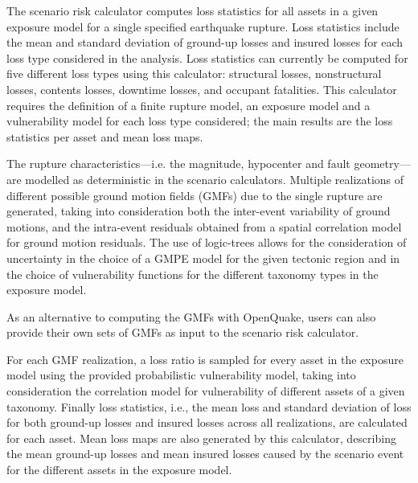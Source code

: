 The scenario risk calculator computes loss statistics for all assets in a given exposure model for a single specified earthquake rupture. Loss statistics include the mean and standard deviation of ground-up losses and insured losses for each loss type considered in the analysis. Loss statistics can currently be computed for five different loss types using this calculator: structural losses, nonstructural losses, contents losses, downtime losses, and occupant fatalities. This calculator requires the definition of a finite rupture model, an exposure model and a vulnerability model for each loss type considered; the main results are the loss statistics per asset and mean loss maps.

The rupture characteristics—i.e. the magnitude, hypocenter and fault geometry—are modelled as deterministic in the scenario calculators. Multiple realizations of different possible ground motion fields (GMFs) due to the single rupture are generated, taking into consideration both the inter-event variability of ground motions, and the intra-event residuals obtained from a spatial correlation model for ground motion residuals. The use of logic-trees allows for the consideration of uncertainty in the choice of a GMPE model for the given tectonic region and in the choice of vulnerability functions for the different taxonomy types in the exposure model.

As an alternative to computing the GMFs with OpenQuake, users can also provide their own sets of GMFs as input to the scenario risk calculator.

For each GMF realization, a loss ratio is sampled for every asset in the exposure model using the provided probabilistic vulnerability model, taking into consideration the correlation model for vulnerability of different assets of a given taxonomy. Finally loss statistics, i.e., the mean loss and standard deviation of loss for both ground-up losses and insured losses across all realizations, are calculated for each asset. Mean loss maps are also generated by this calculator, describing the mean ground-up losses and mean insured losses caused by the scenario event for the different assets in the exposure model.
